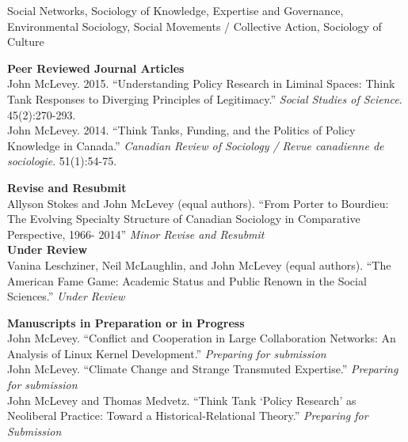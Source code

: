 \documentclass[9pt,usenames,dvipsnames]{article}
\begin{document}

\noindent Social Networks, Sociology of Knowledge, Expertise and Governance, Environmental Sociology, Social Movements / Collective Action, Sociology of Culture \\


\ind \textbf{Peer Reviewed Journal Articles} \\

\ind John McLevey. 2015. ``Understanding Policy Research in Liminal Spaces: Think Tank Responses to Diverging Principles of Legitimacy.'' \emph{Social Studies of Science}. 45(2):270-293. \\

\ind John McLevey. 2014. ``Think Tanks, Funding, and the Politics of Policy Knowledge in Canada.'' \emph{Canadian Review of Sociology / Revue canadienne de sociologie}. 51(1):54-75.\\


\ind \textbf{Revise and Resubmit} \\

\ind Allyson Stokes and John McLevey (equal authors). ``From Porter to Bourdieu: The Evolving Specialty Structure of Canadian Sociology in Comparative Perspective, 1966- 2014'' \emph{Minor Revise and Resubmit} \\

\ind \textbf{Under Review} \\

\ind Vanina Leschziner, Neil McLaughlin, and John McLevey (equal authors). ``The American Fame Game: Academic Status and Public Renown in the Social Sciences.'' \emph{Under Review} \\

\pagebreak

\ind \textbf{Manuscripts in Preparation or in Progress} \\

\ind John McLevey. ``Conflict and Cooperation in Large Collaboration Networks: An Analysis of Linux Kernel Development.'' \emph{Preparing for submission} \\

\ind John McLevey. ``Climate Change and Strange Transmuted Expertise.'' \emph{Preparing for submission} \\

\ind John McLevey and Thomas Medvetz. ``Think Tank ‘Policy Research' as Neoliberal Practice: Toward a Historical-Relational Theory.'' \emph{Preparing for Submission}\\
\end{document}
